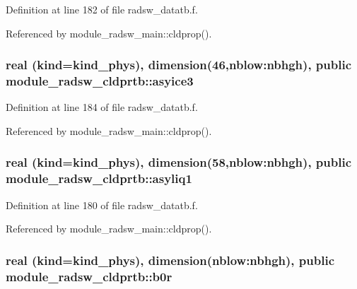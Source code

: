 Definition at line 182 of file radsw\+\_\+datatb.\+f.



Referenced by module\+\_\+radsw\+\_\+main\+::cldprop().

\subsubsection[{\texorpdfstring{asyice3}{asyice3}}]{\setlength{\rightskip}{0pt plus 5cm}real (kind=kind\+\_\+phys), dimension(46,nblow\+:nbhgh), public module\+\_\+radsw\+\_\+cldprtb\+::asyice3}\hypertarget{namespacemodule__radsw__cldprtb_aec2685be0de3a557aca169062cf1055e}{}\label{namespacemodule__radsw__cldprtb_aec2685be0de3a557aca169062cf1055e}


Definition at line 184 of file radsw\+\_\+datatb.\+f.



Referenced by module\+\_\+radsw\+\_\+main\+::cldprop().

\subsubsection[{\texorpdfstring{asyliq1}{asyliq1}}]{\setlength{\rightskip}{0pt plus 5cm}real (kind=kind\+\_\+phys), dimension(58,nblow\+:nbhgh), public module\+\_\+radsw\+\_\+cldprtb\+::asyliq1}\hypertarget{namespacemodule__radsw__cldprtb_a430be0720aa2e2ac46aa1ec7c9a9b64b}{}\label{namespacemodule__radsw__cldprtb_a430be0720aa2e2ac46aa1ec7c9a9b64b}


Definition at line 180 of file radsw\+\_\+datatb.\+f.



Referenced by module\+\_\+radsw\+\_\+main\+::cldprop().

\subsubsection[{\texorpdfstring{b0r}{b0r}}]{\setlength{\rightskip}{0pt plus 5cm}real (kind=kind\+\_\+phys), dimension(nblow\+:nbhgh), public module\+\_\+radsw\+\_\+cldprtb\+::b0r}\hypertarget{namespacemodule__radsw__cldprtb_ac39d49e73ffa960421e36e45a35db162}{}\label{namespacemodule__radsw__cldprtb_ac39d49e73ffa960421e36e45a35db162}


